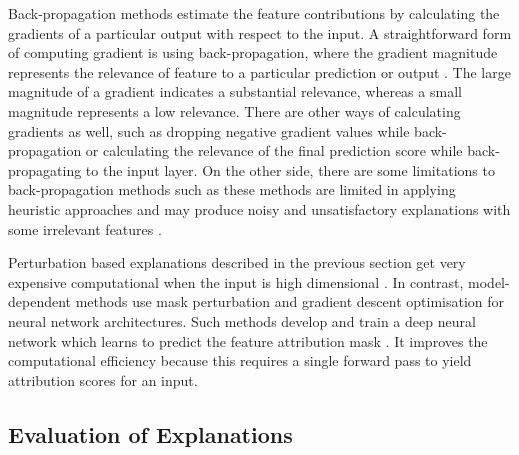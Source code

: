 \documentclass[english]{tktltiki2}
\theoremstyle{definition}
\theoremstyle{remark}
\begin{document}

Back-propagation methods estimate the feature contributions by calculating the gradients of a particular output with respect to the input. A straightforward form of computing gradient is using back-propagation, where the gradient magnitude represents the relevance of feature to a particular prediction or output \citep{guidotti2018survey, ancona2017towards, murdoch2019interpretable}. The large magnitude of a gradient indicates a substantial relevance, whereas a small magnitude represents a low relevance. There are other ways of calculating gradients as well, such as dropping negative gradient values while back-propagation or calculating the relevance of the final prediction score while back-propagating to the input layer. On the other side, there are some limitations to back-propagation methods such as these methods are limited in applying heuristic approaches and may produce noisy and unsatisfactory explanations with some irrelevant features \citep{murdoch2019interpretable}.


Perturbation based explanations described in the previous section get very expensive computational when the input is high dimensional \citep{molnarinterpretable}. In contrast, model-dependent methods use mask perturbation and gradient descent optimisation for neural network architectures. Such methods develop and train a deep neural network which learns to predict the feature attribution mask \citep{molnarinterpretable, ancona2017towards}. It improves the computational efficiency because this requires a single forward pass to yield attribution scores for an input.

\subsection{Evaluation of Explanations}\label{sec:evaluation_of_explanation_methods}\label{sec:evaluation_of_explanations} %
\end{document}
